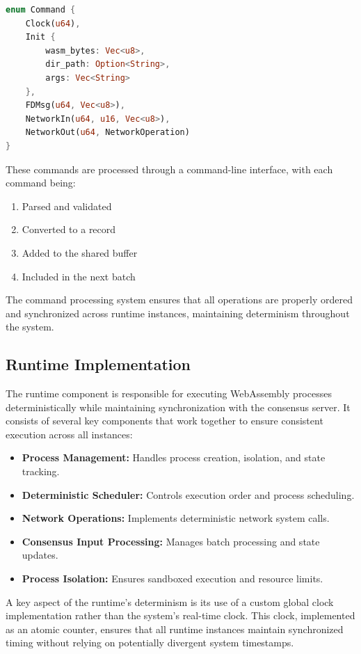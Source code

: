 \documentclass[10pt]{IEEEtran}
\begin{document}
\begin{lstlisting}[language=Rust]
enum Command {
    Clock(u64),
    Init { 
        wasm_bytes: Vec<u8>, 
        dir_path: Option<String>, 
        args: Vec<String> 
    },
    FDMsg(u64, Vec<u8>),
    NetworkIn(u64, u16, Vec<u8>),
    NetworkOut(u64, NetworkOperation)
}
\end{lstlisting}

These commands are processed through a command-line interface, with each command being:
\begin{enumerate}
    \item Parsed and validated
    \item Converted to a record
    \item Added to the shared buffer
    \item Included in the next batch
\end{enumerate}

The command processing system ensures that all operations are properly ordered and synchronized across runtime instances, maintaining determinism throughout the system.

\subsection{Runtime Implementation}

The runtime component is responsible for executing WebAssembly processes deterministically while maintaining synchronization with the consensus server. It consists of several key components that work together to ensure consistent execution across all instances:

\begin{itemize}
    \item \textbf{Process Management:} Handles process creation, isolation, and state tracking.
    \item \textbf{Deterministic Scheduler:} Controls execution order and process scheduling.
    \item \textbf{Network Operations:} Implements deterministic network system calls.
    \item \textbf{Consensus Input Processing:} Manages batch processing and state updates.
    \item \textbf{Process Isolation:} Ensures sandboxed execution and resource limits.
\end{itemize}

A key aspect of the runtime's determinism is its use of a custom global clock implementation rather than the system's real-time clock. This clock, implemented as an atomic counter, ensures that all runtime instances maintain synchronized timing without relying on potentially divergent system timestamps.
\end{document}
